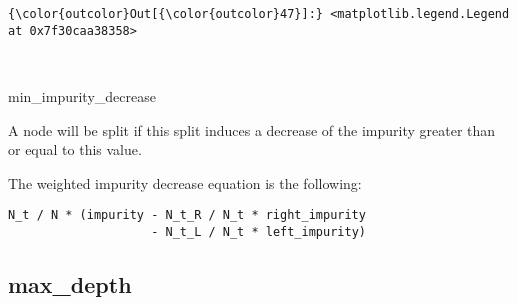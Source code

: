 \documentclass[11pt]{article}
\begin{document}
\begin{Verbatim}[commandchars=\\\{\}]
{\color{outcolor}Out[{\color{outcolor}47}]:} <matplotlib.legend.Legend at 0x7f30caa38358>
\end{Verbatim}
            
    \begin{center}
    \end{center}
    { \hspace*{\fill} \\}
    
    min\_impurity\_decrease

A node will be split if this split induces a decrease of the impurity
greater than or equal to this value.

The weighted impurity decrease equation is the following:

\begin{verbatim}
N_t / N * (impurity - N_t_R / N_t * right_impurity
                    - N_t_L / N_t * left_impurity)
\end{verbatim}

    \subsection{max\_depth}\label{max_depth}
\end{document}
